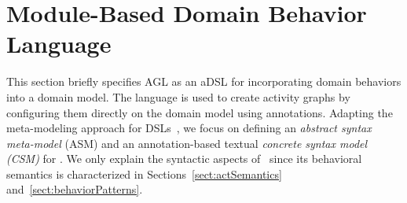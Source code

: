 \section{Module-Based Domain Behavior Language}
\label{sect:agl} 



This section briefly specifies AGL as an aDSL for incorporating domain behaviors into a domain model. The language is used to create activity graphs by configuring them directly on the domain model using annotations. Adapting the meta-modeling approach for DSLs~\cite{kleppe_software_2008}, we focus on defining an \textit{abstract syntax meta-model} (ASM) and an annotation-based textual \textit{concrete syntax model (CSM)} for \agl. We only explain the syntactic aspects of \agl~since its behavioral semantics is characterized in Sections~\ref{sect:actSemantics} and~\ref{sect:behaviorPatterns}.
%
